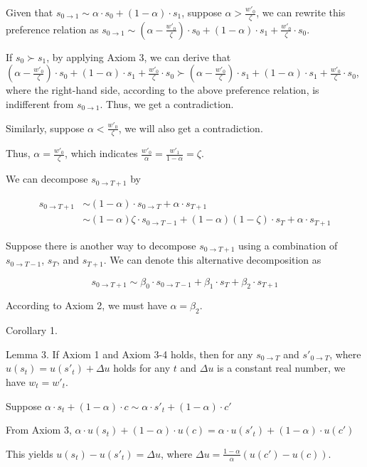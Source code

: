\documentclass[
  12pt,
]{article}
\begin{document}
Given that
\(s_{0\rightarrow 1}\sim\alpha\cdot s_0 + (1-\alpha)\cdot s_1\), suppose
\(\alpha > \frac{w'_0}{\zeta}\), we can rewrite this preference relation
as
\(s_{0\rightarrow 1}\sim(\alpha-\frac{w'_0}{\zeta})\cdot s_0 +(1-\alpha)\cdot s_1 + \frac{w'_0}{\zeta}\cdot s_0\).

If \(s_0 \succ s_1\), by applying Axiom 3, we can derive that
\((\alpha-\frac{w'_0}{\zeta})\cdot s_0 +(1-\alpha)\cdot s_1 + \frac{w'_0}{\zeta}\cdot s_0 \succ (\alpha-\frac{w'_0}{\zeta})\cdot s_1 +(1-\alpha)\cdot s_1 + \frac{w'_0}{\zeta}\cdot s_0\),
where the right-hand side, according to the above preference relation,
is indifferent from \(s_{0\rightarrow 1}\). Thus, we get a
contradiction.

Similarly, suppose \(\alpha < \frac{w'_0}{\zeta}\), we will also get a
contradiction.

Thus, \(\alpha = \frac{w'_0}{\zeta}\), which indicates
\(\frac{w'_0}{\alpha}=\frac{w'_1}{1-\alpha}=\zeta\).

We can decompose \(s_{0\rightarrow T+1}\) by

\[
\begin{aligned}
s_{0\rightarrow T+1} &\sim (1-\alpha)\cdot s_{0\rightarrow T} + \alpha\cdot s_{T+1} \\
&\sim  (1-\alpha) \zeta\cdot s_{0\rightarrow T-1} + (1-\alpha) (1-\zeta)\cdot s_{T} + \alpha\cdot s_{T+1} 
\end{aligned}
\]

Suppose there is another way to decompose \(s_{0 \rightarrow T+1}\)
using a combination of \(s_{0\rightarrow T-1}\), \(s_{T}\), and
\(s_{T+1}\). We can denote this alternative decomposition as

\[
s_{0\rightarrow T+1} \sim \beta_0\cdot s_{0\rightarrow T-1} + \beta_1\cdot s_T + \beta_2\cdot s_{T+1} 
\]

According to Axiom 2, we must have \(\alpha = \beta_2\).

Corollary 1.

Lemma 3. If Axiom 1 and Axiom 3-4 holds, then for any
\(s_{0\rightarrow T}\) and \(s'_{0\rightarrow T}\), where
\(u(s_t)= u(s'_t)+\Delta u\) holds for any \(t\) and \(\Delta u\) is a
constant real number, we have \(w_t=w'_t\).

Suppose
\(\alpha \cdot s_t+(1-\alpha)\cdot c\sim\alpha \cdot s'_t+(1-\alpha)\cdot c'\)

From Axiom 3,
\(\alpha \cdot u(s_t)+(1-\alpha)\cdot u(c)=\alpha \cdot u(s'_t)+(1-\alpha)\cdot u(c')\)

This yields \(u(s_t)-u(s'_t)=\Delta u\), where
\(\Delta u=\frac{1-\alpha}{\alpha} (u(c')-u(c))\).
\end{document}
